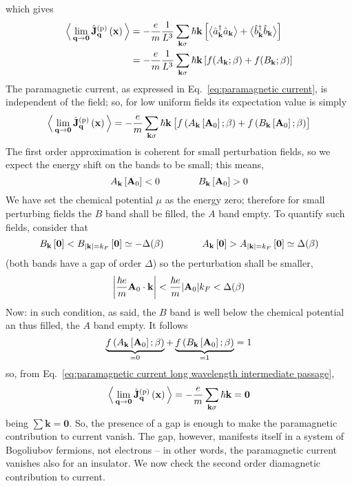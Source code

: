 which gives
\[
\begin{aligned}
	\Big\langle
		\lim_{\mathbf{q}\to\mathbf{0}} \hat{\mathbf{J}}^{(\mathrm{p})}_\mathbf{q} \left({\mathbf{x}}\right)
	\Big\rangle &= - \frac{e}{m} \frac{1}{L^3}  \sum_{\mathbf{k}\sigma} 
	\hbar\mathbf{k} \left[{ 
		\big\langle\hat{a}_\mathbf{k}^\dagger \hat{a}_\mathbf{k}\big\rangle + \big\langle\hat{b}_\mathbf{k}^\dagger \hat{b}_\mathbf{k}\big\rangle
	}\right] \\
	&= - \frac{e}{m} \frac{1}{L^3}  \sum_{\mathbf{k}\sigma} 
	\hbar\mathbf{k} \left[{ 
		f(A_\mathbf{k};\beta) + f(B_\mathbf{k};\beta)
	}\right]
\end{aligned}
\]
The paramagnetic current, as expressed in Eq.~\eqref{eq:paramagnetic current}, is independent of the field; so, for low uniform fields its expectation value is simply
\begin{equation}\label{eq:paramagnetic current long wavelength intermediate passage}
	\Big\langle
	\lim_{\mathbf{q}\to\mathbf{0}} \hat{\mathbf{J}}^{(\mathrm{p})}_\mathbf{q} \left({\mathbf{x}}\right)
	\Big\rangle = 
	- \frac{e}{m} \sum_{\mathbf{k}\sigma} 
	\hbar\mathbf{k} \left[{ 
		\vphantom{A^A}
		f\left({A_\mathbf{k}\left[{\mathbf{A}_0}\right];\beta}\right) + f\left({B_\mathbf{k}\left[{\mathbf{A}_0}\right];\beta}\right)
	}\right]
\end{equation}
The first order approximation is coherent for small perturbation fields, so we expect the energy shift on the bands to be small; this means,
\[
	A_\mathbf{k}\left[{\mathbf{A}_0}\right] < 0
	\qquad\qquad
	B_\mathbf{k}\left[{\mathbf{A}_0}\right] > 0
\]
We have set the chemical potential $\mu$ as the energy zero; therefore for small perturbing fields the $B$ band shall be filled, the $A$ band empty. To quantify such fields, consider that
\[
	B_\mathbf{k}\left[{\mathbf{0}}\right] < B_{\abs{\mathbf{k}}=k_F}\left[{\mathbf{0}}\right] \simeq - \Delta(\beta)
	\qquad\qquad
	A_\mathbf{k}\left[{\mathbf{0}}\right] > A_{\abs{\mathbf{k}}=k_F}\left[{\mathbf{0}}\right] \simeq \Delta(\beta)
\]
(both bands have a gap of order $\Delta$) so the perturbation shall be smaller,
\[
	\abs{\frac{\hbar e}{m} \mathbf{A}_0 \cdot \mathbf{k}} < \frac{\hbar e}{m} \abs{\mathbf{A}_0} k_F < \Delta(\beta)
\]
Now: in such condition, as said, the $B$ band is well below the chemical potential an thus filled, the $A$ band empty. It follows
\[
	\underbrace{f\left({A_\mathbf{k}\left[{\mathbf{A}_0}\right];\beta}\right)}_{=0} + \underbrace{f\left({B_\mathbf{k}\left[{\mathbf{A}_0}\right];\beta}\right)}_{=1} = 1
\]
so, from Eq.~\eqref{eq:paramagnetic current long wavelength intermediate passage},
\[
	\Big\langle
	\lim_{\mathbf{q}\to\mathbf{0}} \hat{\mathbf{J}}^{(\mathrm{p})}_\mathbf{q} \left({\mathbf{x}}\right)
	\Big\rangle = 
	- \frac{e}{m} \sum_{\mathbf{k}\sigma} 
	\hbar\mathbf{k} = \mathbf{0}
\]
being $\sum\mathbf{k}=\mathbf{0}$. So, the presence of a gap is enough to make the paramagnetic contribution to current vanish. The gap, however, manifests itself in a system of Bogoliubov fermions, not electrons -- in other words, the paramagnetic current vanishes also for an insulator. We now check the second order diamagnetic contribution to current.

